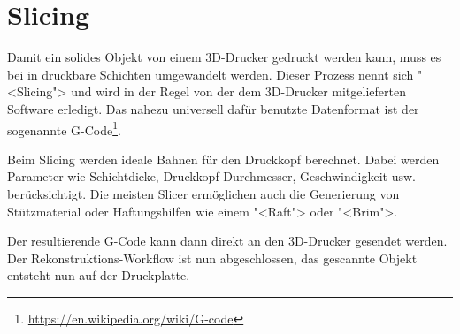 \section{Slicing}

\label{photogrammetry:slicing}

Damit ein solides Objekt von einem 3D-Drucker gedruckt werden kann, muss es bei
in druckbare Schichten umgewandelt werden. Dieser Prozess nennt sich "<Slicing">
und wird in der Regel von der dem 3D-Drucker mitgelieferten Software erledigt.
%
%
Das nahezu universell dafür benutzte Datenformat ist der sogenannte
G-Code\footnote{\url{https://en.wikipedia.org/wiki/G-code}}.

Beim Slicing werden ideale Bahnen für den Druckkopf berechnet. Dabei werden
Parameter wie Schichtdicke, Druckkopf-Durchmesser, Geschwindigkeit usw.
berücksichtigt. Die meisten Slicer ermöglichen auch die Generierung von
Stützmaterial oder Haftungshilfen wie einem "<Raft"> oder "<Brim">.

Der resultierende G-Code kann dann direkt an den 3D-Drucker gesendet werden. Der
Rekonstruktions-Workflow ist nun abgeschlossen, das gescannte Objekt entsteht
nun auf der Druckplatte.
